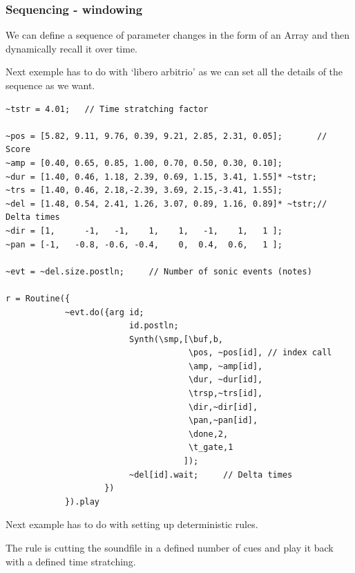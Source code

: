 \subsubsection{Sequencing - windowing}\label{sequencing---windowing}

We can define a sequence of parameter changes in the form of an Array and then dynamically recall it over time.

Next exemple has to do with `libero arbitrio' as we can set all the details of the sequence as we want.

\begin{lstlisting}[frame=single] 
~tstr = 4.01;   // Time stratching factor

~pos = [5.82, 9.11, 9.76, 0.39, 9.21, 2.85, 2.31, 0.05];       // Score
~amp = [0.40, 0.65, 0.85, 1.00, 0.70, 0.50, 0.30, 0.10];
~dur = [1.40, 0.46, 1.18, 2.39, 0.69, 1.15, 3.41, 1.55]* ~tstr;
~trs = [1.40, 0.46, 2.18,-2.39, 3.69, 2.15,-3.41, 1.55];
~del = [1.48, 0.54, 2.41, 1.26, 3.07, 0.89, 1.16, 0.89]* ~tstr;// Delta times 
~dir = [1,      -1,   -1,    1,    1,   -1,    1,   1 ];
~pan = [-1,   -0.8, -0.6, -0.4,    0,  0.4,  0.6,   1 ];

~evt = ~del.size.postln;     // Number of sonic events (notes)

r = Routine({
            ~evt.do({arg id;                           
                         id.postln;
                         Synth(\smp,[\buf,b,
                                     \pos, ~pos[id], // index call
                                     \amp, ~amp[id],
                                     \dur, ~dur[id],
                                     \trsp,~trs[id],
                                     \dir,~dir[id],
                                     \pan,~pan[id],
                                     \done,2,
                                     \t_gate,1
                                    ]);
		                 ~del[id].wait;     // Delta times
	                })
            }).play
\end{lstlisting}

Next example has to do with setting up deterministic rules.

The rule is cutting the soundfile in a defined number of cues and play it back with a defined time stratching.

